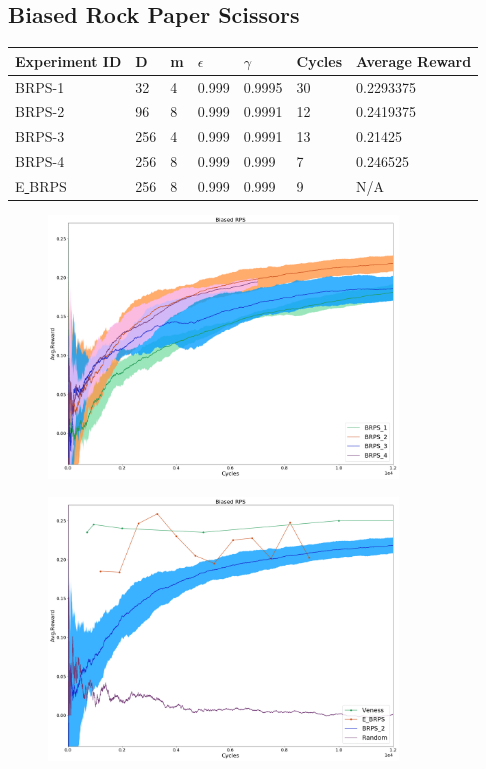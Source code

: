 \documentclass{article}
\theoremstyle{definition}
\newtheorem{primary statistics}[definition]{Primary Statistics}
\newtheorem{auxiliary statistics}[definition]{Auxiliary Statistics}
\begin{document}
\newpage

\subsection{Biased Rock Paper Scissors}
\begin{tabular}{|l|l|l|l|l|l|l|}
\hline \centering
 Experiment ID& D & m & $\epsilon$ & $\gamma$ & Cycles & Average Reward \\ \hline
BRPS-1        & 32        & 4           & 0.999       & 0.9995            & 30     & 0.2293375        \\ \hline
BRPS-2        & 96        & 8           & 0.999       & 0.9991            & 12     & 0.2419375       \\ \hline
BRPS-3        & 256       & 4           & 0.999       & 0.9991            & 13     & 0.21425        \\ \hline
BRPS-4        & 256       & 8           & 0.999       & 0.999             & 7      & 0.246525  \\ \hline  
E\underline{ }BRPS        & 256       & 8           & 0.999       & 0.999             & 9      & N/A  \\ \hline      
\end{tabular}



 \begin{figure}[h]
 \centering
    \includegraphics[width=9.3cm]{4_Biased_RPS}
\end{figure}

\begin{figure}[h]
\centering
    \includegraphics[width=9.3cm]{Biased_RPS}
\end{figure}
\end{document}
